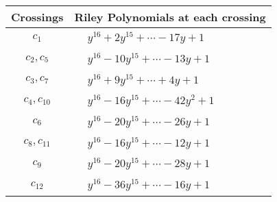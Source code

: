 \documentclass[1p]{elsarticle_modified}
\theoremstyle{definition}
\begin{document}
\begin{tabular}{m{50pt}|m{274pt}}
Crossings & \hspace{64pt}Riley Polynomials at each crossing \\
\hline $$\begin{aligned}c_{1}\end{aligned}$$&$\begin{aligned}
&y^{16}+2 y^{15}+\cdots-17 y+1
\end{aligned}$\\
\hline $$\begin{aligned}c_{2},c_{5}\end{aligned}$$&$\begin{aligned}
&y^{16}-10 y^{15}+\cdots-13 y+1
\end{aligned}$\\
\hline $$\begin{aligned}c_{3},c_{7}\end{aligned}$$&$\begin{aligned}
&y^{16}+9 y^{15}+\cdots+4 y+1
\end{aligned}$\\
\hline $$\begin{aligned}c_{4},c_{10}\end{aligned}$$&$\begin{aligned}
&y^{16}-16 y^{15}+\cdots-42 y^2+1
\end{aligned}$\\
\hline $$\begin{aligned}c_{6}\end{aligned}$$&$\begin{aligned}
&y^{16}-20 y^{15}+\cdots-26 y+1
\end{aligned}$\\
\hline $$\begin{aligned}c_{8},c_{11}\end{aligned}$$&$\begin{aligned}
&y^{16}-16 y^{15}+\cdots-12 y+1
\end{aligned}$\\
\hline $$\begin{aligned}c_{9}\end{aligned}$$&$\begin{aligned}
&y^{16}-20 y^{15}+\cdots-28 y+1
\end{aligned}$\\
\hline $$\begin{aligned}c_{12}\end{aligned}$$&$\begin{aligned}
&y^{16}-36 y^{15}+\cdots-16 y+1
\end{aligned}$\\
\hline
\end{tabular}\\~\\
\end{document}
